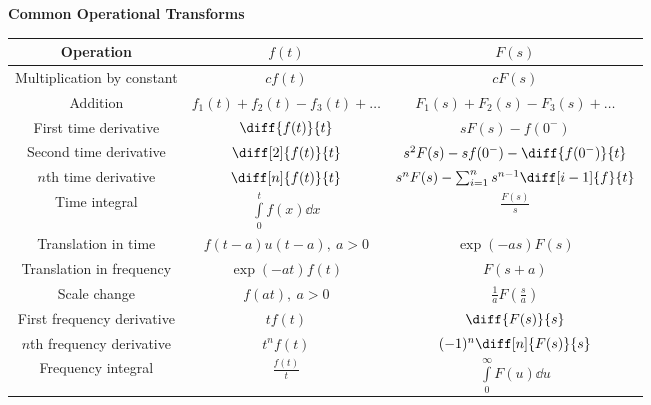 \documentclass[a4paper,11pt]{article}
\begin{document}
	\textbf{Common Operational Transforms}
	\begin{center}
		\begin{longtable}{|c|c|c|}
			\hline
			Operation & $f(t)$ & $F(s)$ \\ \hline
			Multiplication by constant & $cf(t)$ &  $cF(s)$ \\ \hline
			Addition & $f_1(t) + f_2(t) - f_3(t) + \ldots$ & $F_1(s) + F_2(s) - F_3(s) + \ldots$ \\ \hline
			First time derivative & $\diff{f(t)}{t}$ & $sF(s) - f(0^-)$ \\ \hline 
			Second time derivative & $\diff[2]{f(t)}{t}$ & $s^2F(s) - sf(0^-) - \diff{f(0^-)}{t}$ \\ \hline
			$n$th time derivative & $\diff[n]{f(t)}{t}$ & $s^nF(s) - \sum_{i = 1}^{n}s^{n - 1}\diff[i - 1]{f}{t}$ \\ \hline
			Time integral & $\int\limits_0^t f(x)\dd x$ & $\frac{F(s)}{s}$ \\ \hline
			Translation in time & $f(t - a)u(t - a),~a > 0$ & $\exp(-as)F(s)$ \\ \hline
			Translation in frequency & $\exp(-at)f(t)$ & $F(s + a)$ \\ \hline
			Scale change & $f(at),~a > 0$ & $\frac{1}{a}F\left(\frac{s}{a}\right)$ \\ \hline
			First frequency derivative & $tf(t)$ & $\diff{F(s)}{s}$ \\ \hline
			$n$th frequency derivative & $t^nf(t)$ & $(-1)^n\diff[n]{F(s)}{s}$ \\ \hline
			Frequency integral & $\frac{f(t)}{t}$ & $\int\limits_{0}^{\infty} F(u)\dd u$ \\ \hline
		\end{longtable}
	\end{center}
	
\end{document}
